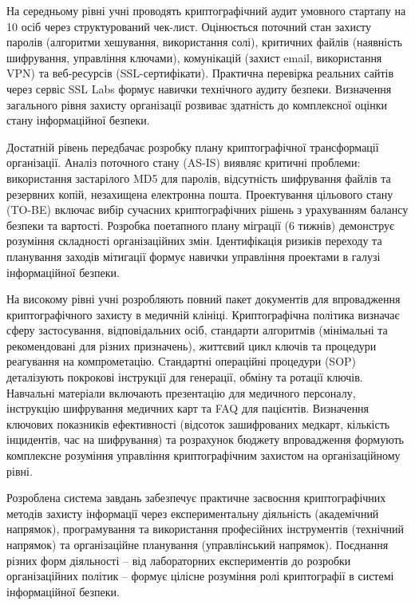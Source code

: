 На середньому рівні учні проводять криптографічний аудит умовного стартапу на 10 осіб через структурований чек-лист. Оцінюється поточний стан захисту паролів (алгоритми хешування, використання солі), критичних файлів (наявність шифрування, управління ключами), комунікацій (захист email, використання VPN) та веб-ресурсів (SSL-сертифікати). Практична перевірка реальних сайтів через сервіс SSL Labs формує навички технічного аудиту безпеки. Визначення загального рівня захисту організації розвиває здатність до комплексної оцінки стану інформаційної безпеки.

Достатній рівень передбачає розробку плану криптографічної трансформації організації. Аналіз поточного стану (AS-IS) виявляє критичні проблеми: використання застарілого MD5 для паролів, відсутність шифрування файлів та резервних копій, незахищена електронна пошта. Проектування цільового стану (TO-BE) включає вибір сучасних криптографічних рішень з урахуванням балансу безпеки та вартості. Розробка поетапного плану міграції (6 тижнів) демонструє розуміння складності організаційних змін. Ідентифікація ризиків переходу та планування заходів мітигації формує навички управління проектами в галузі інформаційної безпеки.

На високому рівні учні розробляють повний пакет документів для впровадження криптографічного захисту в медичній клініці. Криптографічна політика визначає сферу застосування, відповідальних осіб, стандарти алгоритмів (мінімальні та рекомендовані для різних призначень), життєвий цикл ключів та процедури реагування на компрометацію. Стандартні операційні процедури (SOP) деталізують покрокові інструкції для генерації, обміну та ротації ключів. Навчальні матеріали включають презентацію для медичного персоналу, інструкцію шифрування медичних карт та FAQ для пацієнтів. Визначення ключових показників ефективності (відсоток зашифрованих медкарт, кількість інцидентів, час на шифрування) та розрахунок бюджету впровадження формують комплексне розуміння управління криптографічним захистом на організаційному рівні.

Розроблена система завдань забезпечує практичне засвоєння криптографічних методів захисту інформації через експериментальну діяльність (академічний напрямок), програмування та використання професійних інструментів (технічний напрямок) та організаційне планування (управлінський напрямок). Поєднання різних форм діяльності – від лабораторних експериментів до розробки організаційних політик – формує цілісне розуміння ролі криптографії в системі інформаційної безпеки.





